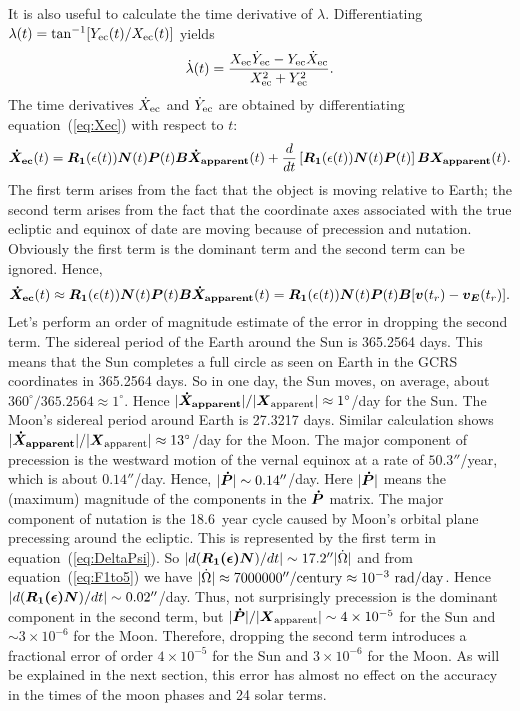 \documentclass[12pt]{article}
\newcommand \beq {\begin{equation}}
\newcommand \eeq {\end{equation}}
\newcommand{\ve}[1]{\mbox{\boldmath $#1$}}
\begin{document}
\begin{CJK}{UTF8}{bkai}
It is also useful to calculate the time derivative of $\lambda$. Differentiating 
$\lambda(t)=\tan^{-1}[Y_{\rm ec}(t)/X_{\rm ec}(t)]$ yields
\beq
  \dot{\lambda}(t) = \frac{X_{\rm ec} \dot{Y}_{\rm ec} - Y_{\rm ec} \dot{X}_{\rm ec}}
{X_{\rm ec}^2 + Y_{\rm ec}^2}  .
\eeq
The time derivatives $\dot{X}_{\rm ec}$ and $\dot{Y}_{\rm ec}$ are obtained by 
differentiating equation~(\ref{eq:Xec}) with respect to $t$:
\beq
  \ve{\dot{X}_{\rm ec}}(t) = \ve{R_1}(\epsilon(t)) \ve{N}(t) \ve{P}(t) \ve{B} 
\ve{\dot{X}_{\rm apparent}}(t) + \frac{d}{dt}\left[\ve{R_1}(\epsilon(t)) \ve{N}(t) \ve{P}(t) 
\right] \ve{B} \ve{X_{\rm apparent}}(t) .
\label{eq:dXec_dt}
\eeq
The first term arises from the fact that the object is moving relative to Earth; 
the second term arises from the fact that the coordinate axes associated with  
the true ecliptic and equinox of date are moving because of precession and 
nutation. Obviously the first term is the dominant term and the second term can be 
ignored. Hence, 
\beq
  \ve{\dot{X}_{\rm ec}}(t) \approx \ve{R_1}(\epsilon(t)) \ve{N}(t) \ve{P}(t) \ve{B}
\ve{\dot{X}_{\rm apparent}}(t) = \ve{R_1}(\epsilon(t)) \ve{N}(t) \ve{P}(t) \ve{B} 
[\ve{v}(t_r) - \ve{v_E}(t_r)] .
\eeq
Let's perform an order of magnitude estimate of the error in dropping the second term. 
The sidereal period of 
the Earth around the Sun is 365.2564 days. This means that the Sun completes a 
full circle as seen on Earth in the GCRS coordinates in 365.2564 days. So 
in one day, the Sun moves, on average, about $360^\circ/365.2564 \approx 1^\circ$. 
Hence $|\ve{\dot{X}_{\rm apparent}}|/|\ve{X}_{\rm apparent}| \approx 1^\circ$/day 
for the Sun. The Moon's sidereal period around Earth is 27.3217 days. Similar 
calculation shows 
$|\ve{\dot{X}_{\rm apparent}}|/|\ve{X}_{\rm apparent}| \approx 13^\circ$/day 
for the Moon. The major component of precession is the westward motion 
of the vernal equinox at a rate of $50.3''$/year, which is about $0.14''$/day. 
Hence, $|\ve{\dot{P}}|\sim 0.14''$/day. Here $|\ve{\dot{P}}|$ means 
the (maximum) magnitude of the components in the $\ve{\dot{P}}$ matrix. 
The major component of nutation is 
the 18.6~year cycle caused by Moon's orbital plane precessing around the ecliptic. 
This is represented by the first term in equation~(\ref{eq:DeltaPsi}). So 
$|d(\ve{R_1(\epsilon)N})/dt|\sim 17.2'' |\dot{\Omega}|$ and from equation~(\ref{eq:F1to5}) 
we have $|\dot{\Omega}| \approx 7000000''/{\rm century} \approx 10^{-3}~{\rm rad/day}$. 
Hence $|d(\ve{R_1(\epsilon)N})/dt|\sim 0.02''$/day. Thus, not surprisingly precession is 
the dominant component in the second term, but $|\ve{\dot{P}}|/|\ve{X}_{\rm apparent}| 
\sim 4\times 10^{-5}$ for the Sun and $\sim 3\times 10^{-6}$ for the Moon. 
Therefore, dropping the second term introduces a fractional error of order 
$4\times 10^{-5}$ for the Sun and $3\times 10^{-6}$ for the Moon. As will be 
explained in the next section, this error has almost no effect on the accuracy 
in the times of the moon phases and 24 solar terms.


\end{CJK}
\end{document}
